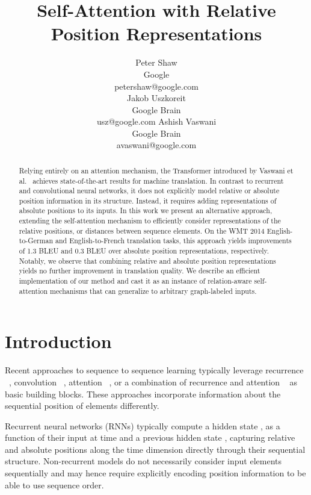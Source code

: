 \documentclass[11pt,a4paper]{article}
\title{Self-Attention with Relative Position Representations}
\author{Peter Shaw \\ Google \\ petershaw@google.com \\
\And
Jakob Uszkoreit \\ Google Brain \\ usz@google.com
\And
Ashish Vaswani \\ Google Brain \\ avaswani@google.com
}
\begin{document}
\maketitle
\begin{abstract}

Relying entirely on an attention mechanism, the Transformer introduced by Vaswani et al.~ achieves state-of-the-art results for machine translation. In contrast to recurrent and convolutional neural networks, it does not explicitly model relative or absolute position information in its structure. 
Instead, it requires adding representations of absolute positions to its inputs.
In this work we present an alternative approach, extending the self-attention mechanism to efficiently consider representations of the relative positions, or distances between sequence elements.
On the WMT 2014 English-to-German and English-to-French translation tasks, this approach yields improvements of 1.3 BLEU and 0.3 BLEU over absolute position representations, respectively. Notably, we observe that combining relative and absolute position representations yields no further improvement in translation quality.
We describe an efficient implementation of our method and cast it as an instance of relation-aware self-attention mechanisms that can generalize to arbitrary graph-labeled inputs.

\end{abstract}

\section{Introduction}

Recent approaches to sequence to sequence learning typically leverage recurrence
~\cite{sutskever2014}, convolution ~\cite{gehring2017, kalchbrenner2016},
attention ~\cite{vaswani2017}, or a combination of recurrence and attention
~\cite{bahdanau2014, cho2014, luong2015, wu2016} as basic building blocks. These approaches incorporate
information about the sequential position of elements differently.

Recurrent neural networks (RNNs) typically compute a hidden state , as a function of their input at time  and a previous hidden state , capturing relative and absolute positions along the time dimension directly through their sequential structure.
Non-recurrent models do not necessarily consider input elements sequentially and may hence require explicitly encoding position information to be able to use sequence order. 
\end{document}
